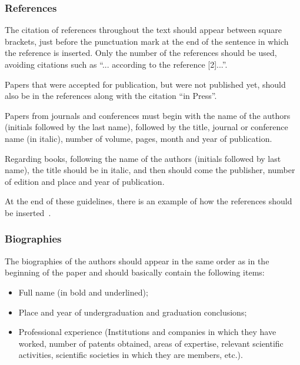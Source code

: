 \documentclass[english]{cobep-spec}
\begin{document}
\subsubsection{References}

The citation of references throughout the text should appear between square brackets, just before the punctuation mark at the end of the sentence in which the reference is inserted. Only the number of the references should be used, avoiding citations such as ``... according to the reference [2]...''.

Papers that were accepted for publication, but were not published yet, should also be in the references along with the citation ``in Press''.

Papers from journals and conferences must begin with the name of the authors (initials followed by the last name), followed by the title, journal or conference name (in italic), number of volume, pages, month and year of publication. 

Regarding books, following the name of the authors (initials followed by last name), the title should be in italic, and then should come the publisher, number of edition and place and year of publication.

At the end of these guidelines, there is an example of how the references should be inserted~\cite{refbib1,refbib2,refbib3,refbib4,refbib5,refbib6,refbib7,refbib8}.







\subsubsection{Biographies}

The biographies of the authors should appear in the same order as in the beginning of the paper and should basically contain the following items:
\begin{itemize}
	\item Full name (in bold and underlined);
	\item Place and year of undergraduation and graduation conclusions;
	\item Professional experience (Institutions and companies in which they have worked, number of patents obtained, areas of expertise, relevant scientific activities, scientific societies in which they are members, etc.). \newline
\end{itemize}
\end{document}
